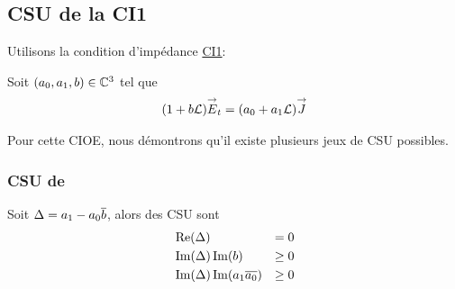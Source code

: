   \subsection{CSU de la CI1}

    Utilisons la condition d’impédance \hyperlink{ci1}{CI1}:

    Soit \((a_0, a_1,b) \in \mathbb C^3\) tel que
    \begin{align*}
      (1 + b \mathcal{L}) {\overset{\rightarrow}{E}}_t = (a_0 + a_1 \mathcal{L}) {\overset{\rightarrow}{J}}
    \end{align*}

    Pour cette CIOE, nous démontrons qu'il existe plusieurs jeux de CSU possibles.

    \subsubsection{CSU de \cite{stupfel_sufficient_2011}}

      \begin{prop}
        Soit \(\Delta = a_1 - a_0{\overline{b}}\), alors des CSU sont
        \begin{align}
          &\operatorname{Re}(\Delta) &= 0\\
          &\operatorname{Im}(\Delta)\operatorname{Im}(b) &\ge 0\\
          &\operatorname{Im}(\Delta)\operatorname{Im}(a_1{\overline{a_0}})&\ge 0
        \end{align}
      \end{prop}

